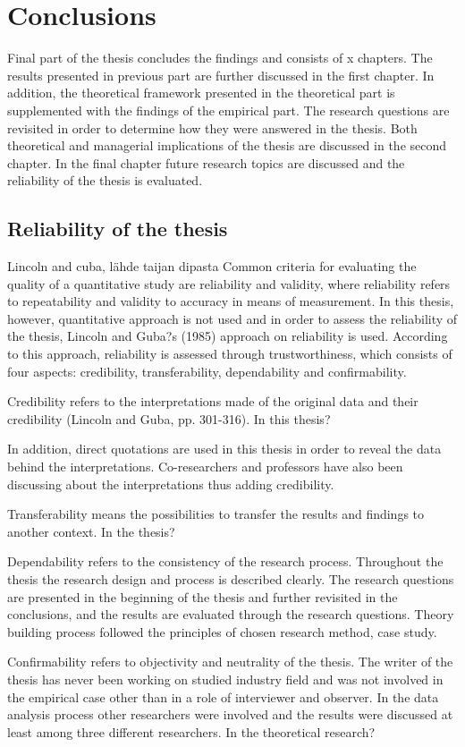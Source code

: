 \chapter{Conclusions}
Final part of the thesis concludes the findings and consists of x chapters. The results presented in previous part are further discussed in the first chapter. In addition, the theoretical framework presented in the theoretical part is supplemented with the findings of the empirical part. The research questions are revisited in order to determine how they were answered in the thesis. Both theoretical and managerial implications of the thesis are discussed in the second chapter. In the final chapter future research topics are discussed and the reliability of the thesis is evaluated.

\section{Reliability of the thesis}
Lincoln and cuba, l\"ahde taijan dipasta
Common criteria for evaluating the quality of a quantitative study are reliability and validity, where reliability refers to repeatability and validity to accuracy in means of measurement. In this thesis, however, quantitative approach is not used and in order to assess the reliability of the thesis, Lincoln and Guba?s (1985) approach on reliability is used. According to this approach, reliability is assessed through trustworthiness, which consists of four aspects: credibility, transferability, dependability and confirmability. 

Credibility refers to the interpretations made of the original data and their credibility (Lincoln and Guba, pp. 301-316). In this thesis? 

In addition, direct quotations are used in this thesis in order to reveal the data behind the interpretations. Co-researchers and professors have also been discussing about the interpretations thus adding credibility. 

Transferability means the possibilities to transfer the results and findings to another context. In the thesis?

Dependability refers to the consistency of the research process. Throughout the thesis the research design and process is described clearly. The research questions are presented in the beginning of the thesis and further revisited in the conclusions, and the results are evaluated through the research questions. 
Theory building process followed the principles of chosen research method, case study. 

Confirmability refers to objectivity and neutrality of the thesis. The writer of the thesis has never been working on studied industry field and was not involved in the empirical case other than in a role of interviewer and observer. In the data analysis process other researchers were involved and the results were discussed at least among three different researchers. In the theoretical research? 
